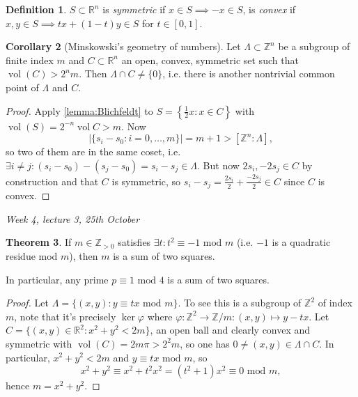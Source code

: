 \documentclass{article}
\newcommand{\Z}{\mathbb{Z}}
\newcommand{\R}{\mathbb{R}}
\newcommand{\Mod}{\text{ mod }}
\newcommand{\vol}{\operatorname{vol}}
\theoremstyle{definition}
\newtheorem{defn}{Definition}[subsection]
\newtheorem{thm}[defn]{Theorem}
\newtheorem{coro}[defn]{Corollary}
\begin{document}
\begin{defn}
$S\subset\R^n$ is \textit{symmetric} if $x\in S\implies -x\in S$, is \textit{convex} if $x,y\in S\implies tx+(1-t)y\in S$ for $t\in [0,1]$.
\end{defn}

\begin{coro}[Minskowski's geometry of numbers]
\label{coro:Minkowski}
Let $\Lambda\subset\Z^n$ be a subgroup of finite index $m$ and $C\subset\R^n$ an open, convex, symmetric set such that $\vol(C)>2^nm$. Then $\Lambda\cap C\neq\{0\}$, i.e. there is another nontrivial common point of $\Lambda$ and $C$.
\end{coro}
\begin{proof}
Apply \ref{lemma:Blichfeldt} to $S=\left\{\frac12 x:x\in C\right\}$ with $\vol(S)=2^{-n}\vol C>m$. Now
\[
|\{s_i-s_0:i=0,\ldots,m\}|=m+1>[\Z^n:\Lambda],
\]
so two of them are in the same coset, i.e. $\exists i\neq j:(s_i-s_0)-(s_j-s_0)=s_i-s_j\in\Lambda$. But now $2s_i,-2s_j\in C$ by construction and that $C$ is symmetric, so $s_i-s_j=\frac{2s_i}{2}+\frac{-2s_j}{2}\in C$ since $C$ is convex.
\end{proof}

\begin{flushright}
\textit{Week 4, lecture 3, 25th October}
\end{flushright}

\begin{thm}
If $m\in\Z_{>0}$ satisfies $\exists t:t^2\equiv -1\Mod m$ (i.e. $-1$ is a quadratic residue mod $m$), then $m$ is a sum of two squares.

In particular, any prime $p\equiv 1\Mod 4$ is a sum of two squares.
\end{thm}
\begin{proof}
Let $\Lambda=\{(x,y):y\equiv tx\Mod m\}$. To see this is a subgroup of $\Z^2$ of index $m$, note that it's precisely $\ker\varphi$ where $\varphi:\Z^2\rightarrow\Z/m:(x,y)\mapsto y-tx$. Let $C=\{(x,y)\in\R^2:x^2+y^2<2m\}$, an open ball and clearly convex and symmetric with $\vol(C)=2m\pi>2^2m$, so one has $0\neq (x,y)\in\Lambda \cap C$. In particular, $x^2+y^2<2m$ and $y\equiv tx\Mod m$, so
\[
x^2+y^2\equiv x^2+t^2x^2=(t^2+1)x^2\equiv 0\Mod m,
\]
hence $m=x^2+y^2$.
\end{proof}
\end{document}
